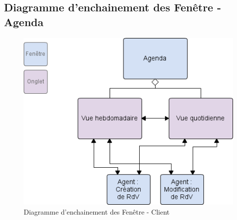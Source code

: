 \subsection{Diagramme d'enchainement des Fenêtre - Agenda} 

\begin{figure}[H]
	\begin{center}
		\includegraphics[scale=0.6]{EDF/Agenda.png}
		\caption{Diagramme d'enchainement des Fenêtre - Client}
	\end{center}
\end{figure}